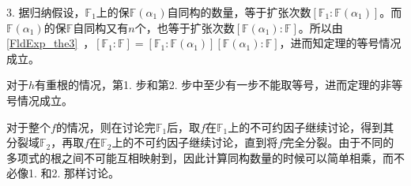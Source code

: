 3. 据归纳假设，$\mathbb{F}_1$上的保$\mathbb{F}(\alpha_1)$自同构的数量，等于扩张次数$[\mathbb{F}_1:\mathbb{F}(\alpha_1)]$。而$\mathbb{F}(\alpha_1)$的保$\mathbb{F}$自同构又有$n$个，也等于扩张次数$[\mathbb{F}(\alpha_1):\mathbb{F}]$。所以由\autoref{FldExp_the3}~，$[\mathbb{F}_1:\mathbb{F}]=[\mathbb{F}_1:\mathbb{F}(\alpha_1)][\mathbb{F}(\alpha_1):\mathbb{F}]$，进而知定理的等号情况成立。

对于$h$有重根的情况，第1. 步和第2. 步中至少有一步不能取等号，进而定理的非等号情况成立。

对于整个$f$的情况，则在讨论完$\mathbb{F}_1$后，取$f$在$\mathbb{F}_1$上的不可约因子继续讨论，得到其分裂域$\mathbb{F}_2$，再取$f$在$\mathbb{F}_2$上的不可约因子继续讨论，直到将$f$完全分裂。由于不同的多项式的根之间不可能互相映射到，因此计算同构数量的时候可以简单相乘，而不必像1. 和2. 那样讨论。












